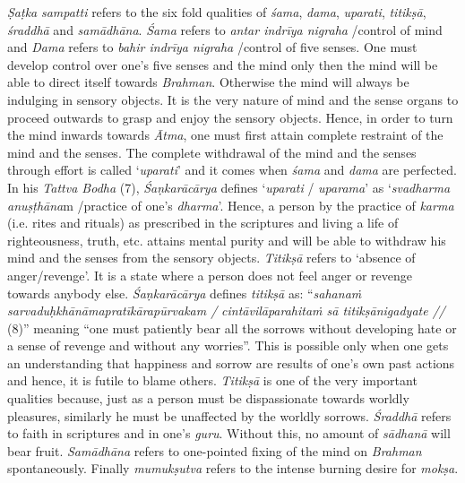 \emph{Ṣaṭka} \emph{sampatti} refers to the six fold qualities of \emph{śama}, \emph{dama}, \emph{uparati}, \emph{titikṣā}, \emph{śraddhā} and \emph{samādhāna}. \emph{Śama} refers to \emph{antar indrīya nigraha} /control of mind and \emph{Dama} refers to \emph{bahir indrīya nigraha} /control of five senses. One must develop control over one's five senses and the mind only then the mind will be able to direct itself towards \emph{Brahman}. Otherwise the mind will always be indulging in sensory objects. It is the very nature of mind and the sense organs to proceed outwards to grasp and enjoy the sensory objects. Hence, in order to turn the mind inwards towards \emph{Ātma}, one must first attain complete restraint of the mind and the senses. The complete withdrawal of the mind and the senses through effort is called `\emph{uparati}' and it comes when \emph{śama} and \emph{dama} are perfected. In his \emph{Tattva Bodha} (7), \emph{Śaṇkarācārya} defines `\emph{uparati} / \emph{uparama}' as `\emph{svadharma} \emph{anuṣṭhāna}m /practice of one's \emph{dharma}'. Hence, a person by the practice of \emph{karma} (i.e. rites and rituals) as prescribed in the scriptures and living a life of righteousness, truth, etc. attains mental purity and will be able to withdraw his mind and the senses from the sensory objects. \emph{Titikṣā} refers to `absence of anger/revenge'. It is a state where a person does not feel anger or revenge towards anybody else. \emph{Śaṇkarācārya} defines \emph{titikṣā} as: ``\emph{sahanaṁ sarvaduḥkhānāmapratīkārapūrvakam /} \emph{cintāvilāparahitaṁ sā titikṣānigadyate //} (8)'' meaning ``one must patiently bear all the sorrows without developing hate or a sense of revenge and without any worries''. This is possible only when one gets an understanding that happiness and sorrow are results of one's own past actions and hence, it is futile to blame others. \emph{Titikṣā} is one of the very important qualities because, just as a person must be dispassionate towards worldly pleasures, similarly he must be unaffected by the worldly sorrows. \emph{Śraddhā} refers to faith in scriptures and in one's \emph{guru}. Without this, no amount of \emph{sādhanā} will bear fruit. \emph{Samādhāna} refers to one-pointed fixing of the mind on \emph{Brahman} spontaneously. Finally \emph{mumukṣutva} refers to the intense burning desire for \emph{mokṣa}.

